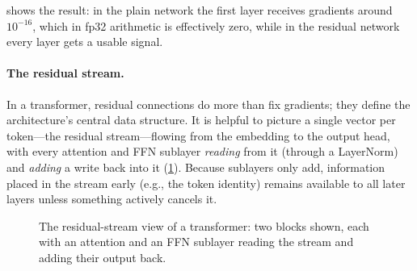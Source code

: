  shows the result: in the plain network the first layer receives gradients
around $10^{-16}$, which in fp32 arithmetic is effectively zero, while in the residual network every
layer gets a usable signal.

\paragraph{The residual stream.}
In a transformer, residual connections do more than fix gradients; they define the architecture's
central data structure. It is helpful to picture a single vector per token---the residual
stream---flowing from the embedding to the output head, with every attention and FFN sublayer
\emph{reading} from it (through a LayerNorm) and \emph{adding} a write back into it
(\cref{fig:gpt:residualstream}). Because sublayers only add, information placed in the stream
early (e.g., the token identity) remains available to all later layers unless something actively
cancels it.

\begin{figure}[t]
\centering
{}
\caption{The residual-stream view of a transformer: two blocks shown, each with an attention and
an FFN sublayer reading the stream and adding their output back.}
\label{fig:gpt:residualstream}
\end{figure}

